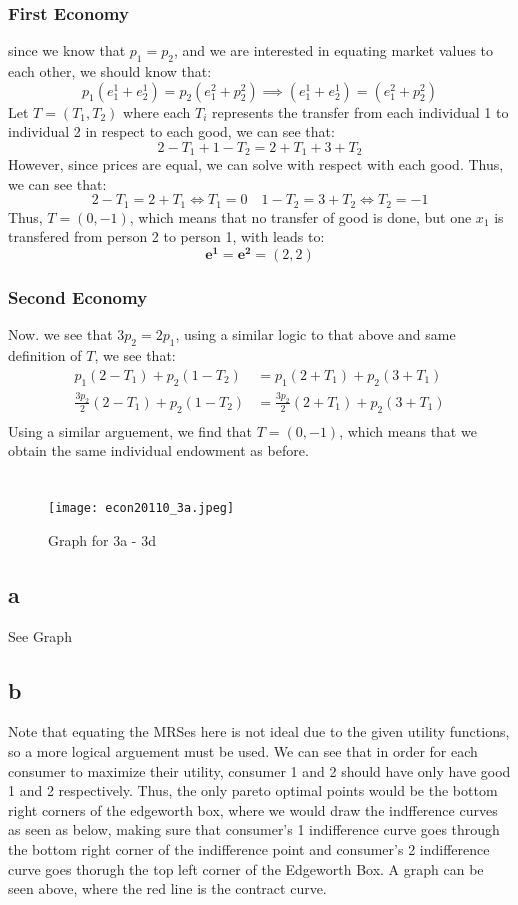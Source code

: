 \documentclass[11pt]{article}
\begin{document}
\subsubsection*{First Economy}
since we know that $p_1 = p_2$, and we are interested in equating market values to each other, we should know that:
\[
p_1(e_1^1 + e_2^1) = p_2(e_1^2 + p_2^2) \implies (e_1^1 + e_2^1) = (e_1^2 + p_2^2)
\]
Let $T = (T_1, T_2)$ where each $T_i$ represents the transfer from each individual 1 to individual 2 in respect to each good, we can see that:
\[
2 - T_1 + 1 - T_2 = 2 + T_1 + 3 + T_2 
\]
However, since prices are equal, we can solve with respect with each good. Thus, we can see that:
\[
2 - T_1 = 2 + T_1 \iff T_1 = 0 \quad 1 - T_2 = 3 + T_2 \iff T_2 = -1
\]
Thus, $T = (0, -1)$, which means that no transfer of good is done, but one $x_1$ is transfered from person 2 to person 1, with leads to:
\[
\mathbf{e^1} = \mathbf{e^2}= (2, 2)
\]
\subsubsection*{Second Economy}
Now. we see that $3p_2 = 2p_1$, using a similar logic to that above and same definition of $T$, we see that:
\begin{align*}
    p_1(2-T_1) + p_2(1-T_2) &= p_1(2+T_1) + p_2(3 + T_1)\\
    \frac{3p_2}{2}(2 - T_1) + p_2(1 - T_2) &= \frac{3p_2}{2}(2+T_1) + p_2(3+T_1)\\
\end{align*}
Using a similar arguement, we find that $T = (0, -1)$, which means that we obtain the same individual endowment as before.
\section{}
\begin{figure}[H]
    \centering
    \texttt{[image: econ20110\_3a.jpeg]}
    \caption{Graph for 3a - 3d}
    \label{fig:aentaesras-aslasasabel}
\end{figure}
\subsection*{a}
See Graph
\subsection*{b}
Note that equating the MRSes here is not ideal due to the given utility functions, so a more logical arguement must be used. We can see that in order for each consumer to maximize their utility, consumer 1 and 2 should have only have good 1 and 2 respectively. Thus, the only pareto optimal points would be the bottom right corners of the edgeworth box, where we would draw the indfference curves as seen as below, making sure that consumer's 1 indifference curve goes through the bottom right corner of the indifference point and consumer's 2 indifference curve goes thorugh the top left corner of the Edgeworth Box. A graph can be seen above, where the red line is the contract curve. 
\end{document}
